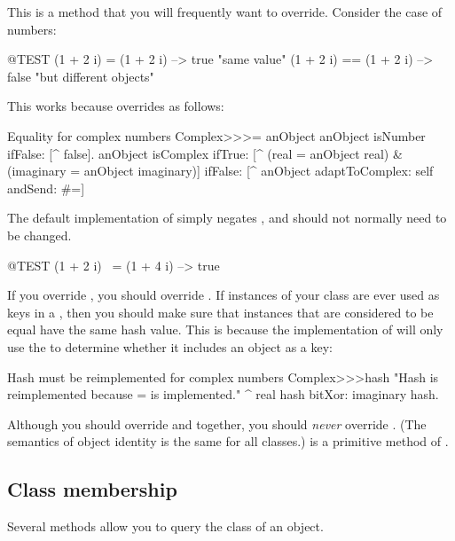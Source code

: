 \documentclass[a4paper,10pt,twoside]{book}
\begin{document}
This is a method that you will frequently want to override.
Consider the case of  numbers:

\begin{code}{@TEST}
(1 + 2 i) = (1 + 2 i)   --> true     "same value"
(1 + 2 i) == (1 + 2 i) --> false    "but different objects"
\end{code}

This works because  overrides \ct{=} as follows:
\begin{method}{Equality for complex numbers}
Complex>>>= anObject
	anObject isNumber ifFalse: [^ false].
	anObject isComplex
		ifTrue: [^ (real = anObject real) & (imaginary = anObject imaginary)]
		ifFalse: [^ anObject adaptToComplex: self andSend: #=]
\end{method}

The default implementation of  simply negates , and should not normally need to be changed.

\begin{code}{@TEST}
(1 + 2 i) ~= (1 + 4 i) --> true
\end{code}

If you override \ct{=}, you should override .
If instances of your class are ever used as keys in a , then you should make sure that instances that are considered to be equal have the same hash value. This is because the implementation of  will only use the  to determine whether it includes an object as a key:
\begin{method}{Hash must be reimplemented for complex numbers}
Complex>>>hash
    "Hash is reimplemented because = is implemented."
    ^ real hash bitXor: imaginary hash.
\end{method}

Although you should override \ct{=} and  together, you should \emph{never} override \ct{==}.
(The semantics of object identity is the same for all classes.)
\ct{==} is a primitive method of .


\subsection{Class membership}
Several methods allow you to query the class of an object. 
\end{document}
